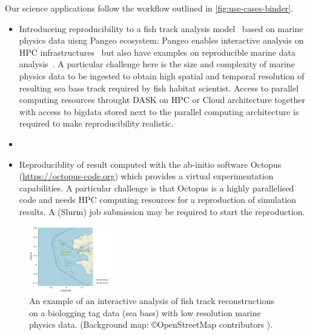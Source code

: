     Our science applications follow the workflow outlined in
    \ref{fig:use-cases-binder}. 
    \begin{itemize}
    \item Introduceing reproducibility to a fish track analysis model~\cite{woillez2016} based on
      marine physics data uisng Pangeo ecosystem:
      Pangeo enables interactive analysis on HPC infrastructures~\cite{odaka2020}
      but also have examples on reproducible marine data analysis~\cite{maze2020}.
      A particular challenge here is
      the size and complexity of marine physics data to be ingested
      to obtain high spatial and temporal resolution of resulting sea bass track
      required by fish habitat scientist.
      Access to parallel computing resources throught DASK on HPC or
      Cloud architecture together with access to bigdata stored next to the
      parallel computing architecture is required to make reproducibility realistic.
    \item {}
    \item Reproduciblity of result computed
      with the ab-initio software Octopus
      (\href{https://octopus-code.org}{https://octopus-code.org}) which provides a
      virtual experimentation capabilities. A particular challenge is that Octopus
      is a highly parallelised code and needs HPC computing resources for a
      reproduction of simulation results. A (Slurm) job submission may be required
      to start the reproduction.
    \end{itemize}
    
    \begin{figure}[htb]
      \includegraphics[width=0.33\textwidth]{images/fish.png}
      \caption{An example of an interactive analysis of
      fish track reconstructions on a biologging tag
       data (sea bass) with low resolution marine physics data.
       (Background map: \copyright OpenStreetMap contributors ).} \label{fig:fish}
    \end{figure}
   
